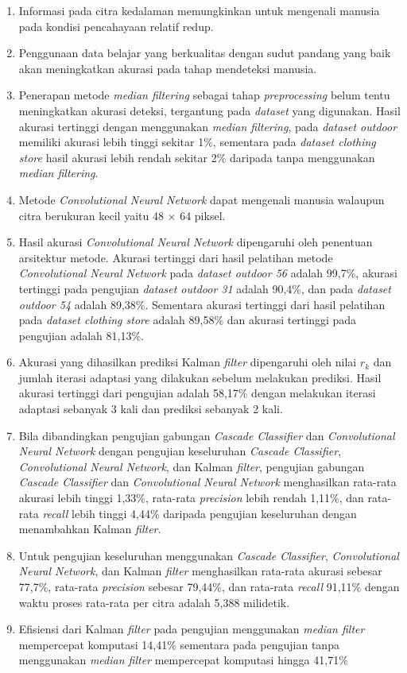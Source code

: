 \begin{enumerate}
\item Informasi pada citra kedalaman memungkinkan untuk mengenali manusia pada kondisi pencahayaan relatif redup.
\item Penggunaan data belajar yang berkualitas dengan sudut pandang yang baik akan meningkatkan akurasi pada tahap mendeteksi manusia.
\item Penerapan metode \textit{median filtering} sebagai tahap \textit{preprocessing} belum tentu meningkatkan akurasi deteksi, tergantung pada \textit{dataset} yang digunakan. Hasil akurasi tertinggi dengan menggunakan \textit{median filtering}, pada \textit{dataset outdoor} memiliki akurasi lebih tinggi sekitar 1\%, sementara pada \textit{dataset clothing store} hasil akurasi lebih rendah sekitar 2\% daripada tanpa menggunakan \textit{median filtering}.
\item Metode \textit{Convolutional Neural Network} dapat mengenali manusia walaupun citra berukuran kecil yaitu 48 $\times$ 64 piksel.
\item Hasil akurasi \textit{Convolutional Neural Network} dipengaruhi oleh penentuan arsitektur metode. Akurasi tertinggi dari hasil pelatihan metode \textit{Convolutional Neural Network} pada \textit{dataset outdoor 56} adalah 99,7\%, akurasi tertinggi pada pengujian \textit{dataset outdoor 31} adalah 90,4\%, dan pada \textit{dataset outdoor 54} adalah 89,38\%. Sementara akurasi tertinggi dari hasil pelatihan pada \textit{dataset clothing store} adalah 89,58\% dan akurasi tertinggi pada pengujian adalah 81,13\%.
\item Akurasi yang dihasilkan prediksi Kalman \textit{filter} dipengaruhi oleh nilai $r_{k}$ dan jumlah iterasi adaptasi yang dilakukan sebelum melakukan prediksi. Hasil akurasi tertinggi dari pengujian adalah 58,17\% dengan melakukan iterasi adaptasi sebanyak 3 kali dan prediksi sebanyak 2 kali.
\item Bila dibandingkan pengujian gabungan \textit{Cascade Classifier} dan \textit{Convolutional Neural Network} dengan pengujian keseluruhan \textit{Cascade Classifier}, \textit{Convolutional Neural Network}, dan Kalman \textit{filter}, pengujian gabungan \textit{Cascade Classifier} dan \textit{Convolutional Neural Network} menghasilkan rata-rata akurasi lebih tinggi 1,33\%, rata-rata \textit{precision} lebih rendah 1,11\%, dan rata-rata \textit{recall} lebih tinggi 4,44\% daripada pengujian keseluruhan dengan menambahkan Kalman \textit{filter}. 
\item Untuk pengujian keseluruhan menggunakan \textit{Cascade Classifier}, \textit{Convolutional Neural Network}, dan Kalman \textit{filter} menghasilkan rata-rata akurasi sebesar 77,7\%, rata-rata \textit{precision} sebesar 79,44\%, dan rata-rata \textit{recall} 91,11\% dengan waktu proses rata-rata per citra adalah 5,388 milidetik.
\item Efisiensi dari Kalman \textit{filter} pada pengujian menggunakan \textit{median filter} mempercepat komputasi 14,41\% sementara pada pengujian tanpa menggunakan \textit{median filter} mempercepat komputasi hingga 41,71\%\\
\end{enumerate}


